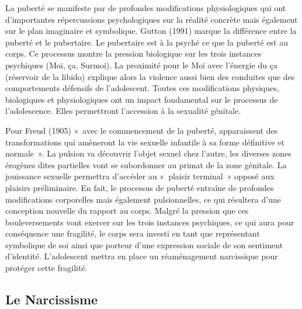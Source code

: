 \documentclass[12pt, a4paper]{book}
\begin{document}
\begin{spacing}{1.5}
La puberté se manifeste par de profondes modifications physiologiques qui ont d'importantes répercussions psychologiques sur la réalité concrète mais également sur le plan imaginaire et symbolique. Gutton (1991) marque la différence entre la puberté et le pubertaire. Le pubertaire est à la psyché ce que la puberté est au corps. Ce processus montre la pression biologique sur les trois instances psychiques (Moi, ça, Surmoi). La proximité pour le Moi avec l'énergie du ça (réservoir de la libido) explique alors la violence aussi bien des conduites que des comportements défensifs de l'adolescent. Toutes ces modifications physiques, biologiques et physiologiques ont un impact fondamental sur le processus de l'adolescence. Elles permettront l'accession à la sexualité génitale. 

Pour Freud (1905) « avec le commencement de la puberté, apparaissent des transformations qui amèneront la vie sexuelle infantile à sa forme définitive et normale ». La pulsion va découvrir l'objet sexuel chez l'autre, les diverses zones érogènes dites partielles vont se subordonner au primat de la zone génitale. La jouissance sexuelle permettra d'accéder au « plaisir terminal »  opposé aux plaisirs préliminaire. En fait, le processus de puberté entraîne de profondes modifications corporelles mais également pulsionnelles, ce qui résultera d'une conception nouvelle du rapport au corps. Malgré la pression que ces bouleversements vont exercer sur les trois instances psychiques, ce qui aura pour conséquence une fragilité, le corps sera investi en tant que  représentant symbolique de soi ainsi que porteur d'une  expression sociale de son sentiment d'identité. L'adolescent mettra en place un réaménagement narcissique pour protéger cette fragilité.

\subsection{Le Narcissisme}


\end{spacing}
\end{document}
